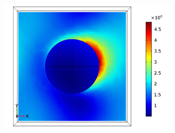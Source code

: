 \begin{figure}[htb!]
\begin{subfigure}{0.32\textwidth}
        \includegraphics[width=\linewidth]{figures/ch4/S5A/FieldDistribution/phi25/z2/Sample5A_TM_Slice@z=+05Rz_wl=300_phi=25.png}
   \end{subfigure}


\end{figure}
